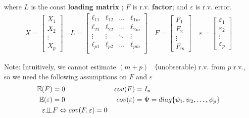     where $ L $ is the $ \mathrm{const} $ \textbf{loading matrix} ; $ F $ is r.v. \textbf{factor}; and $ \varepsilon  $ is r.v. error.
    \begin{align}
        X=\begin{bmatrix}
            X_1\\X_2\\\vdots\\X_p
        \end{bmatrix}\quad
        L=\begin{bmatrix}
        \ell_{11}&\ell_{12}&\ldots&\ell_{1m}\\
        \ell_{21}&\ell_{22}&\ldots&\ell_{2m}\\
        \vdots&\vdots&\ddots&\vdots\\
        \ell_{p1}&\ell_{p2}&\ldots&\ell_{pm}\\
        \end{bmatrix}\quad
        F=\begin{bmatrix}
            F_1\\F_2\\\vdots\\F_m
        \end{bmatrix}
        \quad
        \varepsilon =\begin{bmatrix}
            \varepsilon _1\\\varepsilon _2\\\vdots\\\varepsilon _p
        \end{bmatrix}
    \end{align}

    Note: Intuitively, we cannot estimate $ (m+p) $ （unobserable) r.v. from $ p $ r.v., so we need the following assumptions on $ F $ and $ \varepsilon  $
    \begin{equation}
        \begin{aligned}
            \mathbb{E}(F)&=0&cov(F)&=I_n\\
            \mathbb{E}(\varepsilon )&=0&cov(\varepsilon )&=\Psi =diag\{\psi _1,\psi _2,\ldots ,\psi _p\}\\
            \varepsilon \bot\!\!\!\bot& F\Leftrightarrow cov(F,\varepsilon )=0&&
        \end{aligned}
    \end{equation}

